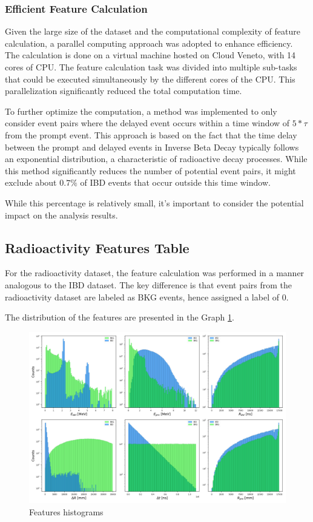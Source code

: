 \subsubsection*{Efficient Feature Calculation}
Given the large size of the dataset and the computational complexity of feature calculation, a parallel computing approach was adopted to enhance efficiency. The calculation is done on a virtual machine hosted on Cloud Veneto, with 14 cores of CPU. The feature calculation task was divided into multiple sub-tasks that could be executed simultaneously by the different cores of the CPU. This parallelization significantly reduced the total computation time.

To further optimize the computation, a method was implemented to only consider event pairs where the delayed event occurs within a time window of $5*\tau$ from the prompt event. This approach is based on the fact that the time delay between the prompt and delayed events in Inverse Beta Decay typically follows an exponential distribution, a characteristic of radioactive decay processes. While this method significantly reduces the number of potential event pairs, it might exclude about $0.7\%$ of IBD events that occur outside this time window. 

While this percentage is relatively small, it's important to consider the potential impact on the analysis results.

\subsection{Radioactivity Features Table}
For the radioactivity dataset, the feature calculation was performed in a manner analogous to the IBD dataset. The key difference is that event pairs from the radioactivity dataset are labeled as BKG events, hence assigned a label of 0.

The distribution of the features are presented in the Graph \ref{fig:hist_features}.
\begin{figure}[h]
	\centering
	\includegraphics[width=1\linewidth]{Images/hist_features.png}
	\caption{Features histograms}
	\label{fig:hist_features}
\end{figure}


